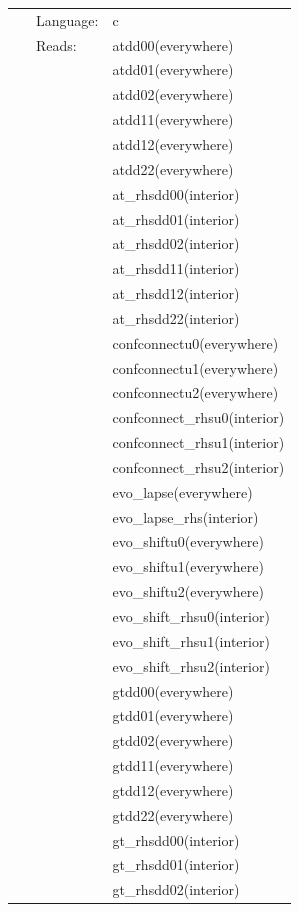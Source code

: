  \begin{tabular*}{160mm}{cll} 
~ & Language:  & c \\ 
~ & Reads:  & atdd00(everywhere) \\ 
~& ~ &atdd01(everywhere)\\ 
~& ~ &atdd02(everywhere)\\ 
~& ~ &atdd11(everywhere)\\ 
~& ~ &atdd12(everywhere)\\ 
~& ~ &atdd22(everywhere)\\ 
~& ~ &at\_rhsdd00(interior)\\ 
~& ~ &at\_rhsdd01(interior)\\ 
~& ~ &at\_rhsdd02(interior)\\ 
~& ~ &at\_rhsdd11(interior)\\ 
~& ~ &at\_rhsdd12(interior)\\ 
~& ~ &at\_rhsdd22(interior)\\ 
~& ~ &confconnectu0(everywhere)\\ 
~& ~ &confconnectu1(everywhere)\\ 
~& ~ &confconnectu2(everywhere)\\ 
~& ~ &confconnect\_rhsu0(interior)\\ 
~& ~ &confconnect\_rhsu1(interior)\\ 
~& ~ &confconnect\_rhsu2(interior)\\ 
~& ~ &evo\_lapse(everywhere)\\ 
~& ~ &evo\_lapse\_rhs(interior)\\ 
~& ~ &evo\_shiftu0(everywhere)\\ 
~& ~ &evo\_shiftu1(everywhere)\\ 
~& ~ &evo\_shiftu2(everywhere)\\ 
~& ~ &evo\_shift\_rhsu0(interior)\\ 
~& ~ &evo\_shift\_rhsu1(interior)\\ 
~& ~ &evo\_shift\_rhsu2(interior)\\ 
~& ~ &gtdd00(everywhere)\\ 
~& ~ &gtdd01(everywhere)\\ 
~& ~ &gtdd02(everywhere)\\ 
~& ~ &gtdd11(everywhere)\\ 
~& ~ &gtdd12(everywhere)\\ 
~& ~ &gtdd22(everywhere)\\ 
~& ~ &gt\_rhsdd00(interior)\\ 
~& ~ &gt\_rhsdd01(interior)\\ 
~& ~ &gt\_rhsdd02(interior)\\ 

\end{tabular*}
